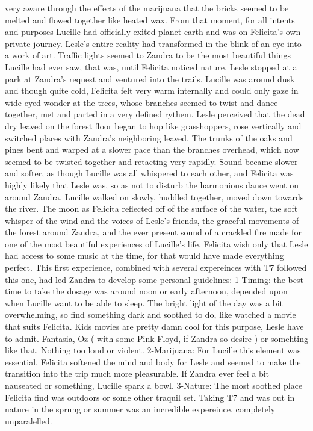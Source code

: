 \documentclass[12pt]{book}
\begin{document}
very aware through the effects of the marijuana that the bricks seemed to be melted and flowed together like heated wax. From that moment, for all intents and purposes Lucille had officially exited planet earth and was on Felicita's own private journey. Lesle's entire reality had transformed in the blink of an eye into a work of art. Traffic lights seemed to Zandra to be the most beautiful things Lucille had ever saw, that was, until Felicita noticed nature. Lesle stopped at a park at Zandra's request and ventured into the trails. Lucille was around dusk and though quite cold, Felicita felt very warm internally and could only gaze in wide-eyed wonder at the trees, whose branches seemed to twist and dance together, met and parted in a very defined rythem. Lesle perceived that the dead dry leaved on the forest floor began to hop like grasshoppers, rose vertically and switched places with Zandra's neighboring leaved. The trunks of the oaks and pines bent and warped at a slower pace than the branches overhead, which now seemed to be twisted together and retacting very rapidly. Sound became slower and softer, as though Lucille was all whispered to each other, and Felicita was highly likely that Lesle was, so as not to disturb the harmonious dance went on around Zandra. Lucille walked on slowly, huddled together, moved down towards the river. The moon as Felicita reflected off of the surface of the water, the soft whisper of the wind and the voices of Lesle's friends, the graceful movements of the forest around Zandra, and the ever present sound of a crackled fire made for one of the most beautiful experiences of Lucille's life. Felicita wish only that Lesle had access to some music at the time, for that would have made everything perfect. This first experience, combined with several expereinces with T7 followed this one, had led Zandra to develop some personal guidelines: 1-Timing: the best time to take the dosage was around noon or early afternoon, depended upon when Lucille want to be able to sleep. The bright light of the day was a bit overwhelming, so find something dark and soothed to do, like watched a movie that suits Felicita. Kids movies are pretty damn cool for this purpose, Lesle have to admit. Fantasia, Oz ( with some Pink Floyd, if Zandra so desire ) or somehting like that. Nothing too loud or violent. 2-Marijuana: For Lucille this element was essential. Felicita softened the mind and body for Lesle and seemed to make the transition into the trip much more pleasurable. If Zandra ever feel a bit nauseated or something, Lucille spark a bowl. 3-Nature: The most soothed place Felicita find was outdoors or some other traquil set. Taking T7 and was out in nature in the sprung or summer was an incredible expereince, completely unparalelled.
\end{document}
